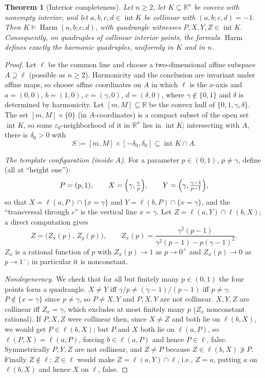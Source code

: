 \documentclass[11pt]{amsart}
\newtheorem{theorem}{Theorem}[section]
\theoremstyle{definition}
\newcommand{\R}{\mathbb{R}}
\newcommand{\Harm}{\operatorname{Harm}}
\newcommand{\interior}{\operatorname{int}}
\begin{document}
\begin{theorem}[Interior completeness]\label{thm:harmonic}
Let $n\ge2$, let $K\subseteq\R^n$ be convex with nonempty interior, and let
$a,b,c,d\in\interior K$ be collinear with $(a,b;c,d)=-1$. Then
$K\models\Harm(a,b;c,d)$, with quadrangle witnesses
$P,X,Y,Z\in\interior K$. Consequently, on quadruples of collinear
\emph{interior} points, the formula $\Harm$ defines exactly the harmonic
quadruples, uniformly in $K$ and in $n$.
\end{theorem}

\begin{proof}
Let $\ell$ be the common line and choose a two-dimensional affine subspace
$A\supseteq\ell$ (possible as $n\ge2$). Harmonicity and the conclusion are
invariant under affine maps, so choose affine coordinates on $A$ in which
$\ell$ is the $x$-axis and $a=(0,0)$, $b=(1,0)$, $c=(\gamma,0)$,
$d=(\delta,0)$, where $\gamma\notin\{0,1\}$ and $\delta$ is determined by
harmonicity. Let $[m,M]\subseteq\R$ be the convex hull of
$\{0,1,\gamma,\delta\}$. The set $[m,M]\times\{0\}$ (in $A$-coordinates) is
a compact subset of the open set $\interior K$, so some
$\varepsilon_0$-neighborhood of it in $\R^n$ lies in $\interior K$;
intersecting with $A$, there is $\delta_0>0$ with
\[
S:=[m,M]\times[-\delta_0,\delta_0]\subseteq\interior K\cap A .
\]

\emph{The template configuration \textup(inside $A$\textup).} For a
parameter $p\in(0,1)$, $p\ne\gamma$, define (all at ``height one''):
\[
P=(p,1),\qquad
X=\Bigl(\gamma,\tfrac{\gamma}{p}\Bigr),\qquad
Y=\Bigl(\gamma,\tfrac{\gamma-1}{p-1}\Bigr),
\]
so that $X=\ell(a,P)\cap\{x=\gamma\}$ and $Y=\ell(b,P)\cap\{x=\gamma\}$, and
the ``transversal through $c$'' is the vertical line $x=\gamma$. Let
$Z=\ell(a,Y)\cap\ell(b,X)$; a direct computation gives
\[
Z=\bigl(Z_x(p),\,Z_y(p)\bigr),\qquad
Z_x(p)=\frac{\gamma^{2}(p-1)}{\gamma^{2}(p-1)-p(\gamma-1)^{2}} .
\]
$Z_x$ is a rational function of $p$ with $Z_x(p)\to1$ as $p\to0^+$ and
$Z_x(p)\to0$ as $p\to1^-$; in particular it is nonconstant.

\emph{Nondegeneracy.} We check that for all but finitely many
$p\in(0,1)$ the four points form a quadrangle. $X\ne Y$ iff
$\gamma/p\ne(\gamma-1)/(p-1)$ iff $p\ne\gamma$. $P\notin\{x=\gamma\}$ since
$p\ne\gamma$, so $P\ne X,Y$ and $P,X,Y$ are not collinear. $X,Y,Z$ are
collinear iff $Z_x=\gamma$, which excludes at most finitely many $p$ ($Z_x$
nonconstant rational). If $P,X,Z$ were collinear then, since $X\ne Z$ and
both lie on $\ell(b,X)$, we would get $P\in\ell(b,X)$; but $P$ and $X$ both
lie on $\ell(a,P)$, so $\ell(P,X)=\ell(a,P)$, forcing $b\in\ell(a,P)$ and
hence $P\in\ell$, false. Symmetrically $P,Y,Z$ are not collinear, and
$Z\ne P$ because $Z\in\ell(b,X)\not\ni P$. Finally $Z\notin\ell$: $Z\in\ell$
would make $Z=\ell(a,Y)\cap\ell$, i.e., $Z=a$, putting $a$ on $\ell(b,X)$
and hence $X$ on $\ell$, false.


\end{proof}
\end{document}

